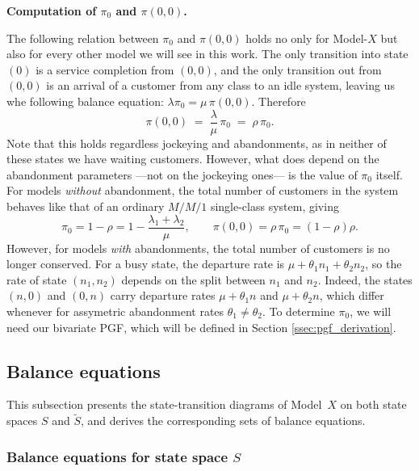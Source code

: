 \textbf{Computation of $\pi_0$ and $\pi(0,0)$.}

The following relation between $\pi_0$ and $\pi(0,0)$ holds no only for Model-$X$ but also for every other model we will see in this work. The only transition into state $(0)$ is a service completion from $(0,0)$, and the only transition out from $(0,0)$ is an arrival of a customer from any class to an idle system, leaving us whe following balance equation: $\lambda\pi_0=\mu\,\pi(0,0)$. Therefore
\begin{equation}
    \pi(0,0) \;=\; \frac{\lambda}{\mu}\,\pi_0 \;=\; \rho\,\pi_0 .
    \label{eq:gen:pi00_general}
\end{equation}
Note that this holds regardless jockeying and abandonments, as in neither of these states we have waiting customers. However, what does depend on the abandonment parameters —not on the jockeying ones— is the value of $\pi_0$ itself.
For models \emph{without} abandonment, the total number of customers in the system behaves like that of an ordinary $M/M/1$ single-class system, giving
\begin{equation}
    \pi_0 = 1-\rho = 1-\frac{\lambda_1+\lambda_2}{\mu},
    \qquad
    \pi(0,0)=\rho\,\pi_0=(1-\rho)\rho.
    \label{eq:gen:pi0_noaband}
\end{equation}
However, for models \emph{with} abandonments, the total number of customers is no longer conserved. For a busy state, the departure rate is $\mu+\theta_1 n_1+\theta_2 n_2$, so the rate of state $(n_1,n_2)$ depends on the split between $n_1$ and $n_2$. Indeed, the states $(n,0)$ and $(0,n)$ carry departure rates $\mu+\theta_1 n$ and $\mu+\theta_2 n$, which differ whenever for assymetric abandonment rates $\theta_1\neq\theta_2$. To determine $\pi_0$, we will need our bivariate PGF, which will be defined in Section \ref{ssec:pgf_derivation}.

\subsection{Balance equations}

This subsection presents the state-transition diagrams of Model~$X$ on both state spaces $S$ and $\widetilde{S}$, and derives the corresponding sets of balance equations.

\subsubsection{Balance equations for state space \texorpdfstring{$S$}{S}} \label{sec:gen:balance_equations}

